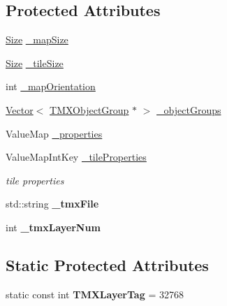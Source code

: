 \subsection*{Protected Attributes}
\begin{DoxyCompactItemize}
\item 
\hyperlink{classSize}{Size} \hyperlink{classTMXTiledMap_a75abce1666e8430273ef914243e554e2}{\+\_\+map\+Size}
\item 
\hyperlink{classSize}{Size} \hyperlink{classTMXTiledMap_ab7f86e9a30c42c0b631651a9096ecea1}{\+\_\+tile\+Size}
\item 
int \hyperlink{classTMXTiledMap_ae696c0e5c2befb7cc07d2542353a36a2}{\+\_\+map\+Orientation}
\item 
\hyperlink{classVector}{Vector}$<$ \hyperlink{classTMXObjectGroup}{T\+M\+X\+Object\+Group} $\ast$ $>$ \hyperlink{classTMXTiledMap_a4f95a1b37b1b0ac9d953b7fb5f2b4d1a}{\+\_\+object\+Groups}
\item 
Value\+Map \hyperlink{classTMXTiledMap_a83f1a2a8df110f2c755d9a1ae4490f3e}{\+\_\+properties}
\item 
\mbox{\label{classTMXTiledMap_a2de86f45817cae4788ec2feeaf9f8246}} 
Value\+Map\+Int\+Key \hyperlink{classTMXTiledMap_a2de86f45817cae4788ec2feeaf9f8246}{\+\_\+tile\+Properties}
\begin{DoxyCompactList}\small\item\em tile properties \end{DoxyCompactList}\item 
\mbox{\label{classTMXTiledMap_a06992011d1ef40a4f168a36ff26cad75}} 
std\+::string {\bfseries \+\_\+tmx\+File}
\item 
\mbox{\label{classTMXTiledMap_aa0fce99641532a752c96d6a0cc8ff451}} 
int {\bfseries \+\_\+tmx\+Layer\+Num}
\end{DoxyCompactItemize}
\subsection*{Static Protected Attributes}
\begin{DoxyCompactItemize}
\item 
\mbox{\label{classTMXTiledMap_a0c788f3339e9d938b28123e628d0902c}} 
static const int {\bfseries T\+M\+X\+Layer\+Tag} = 32768
\end{DoxyCompactItemize}
